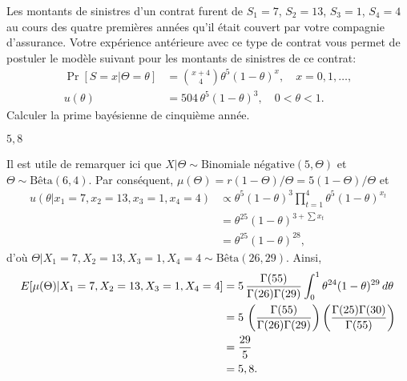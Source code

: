 \begin{exercice}
  Les montants de sinistres d'un contrat furent de $S_1 = 7$, $S_2 =
  13$, $S_3 = 1$, $S_4 = 4$ au cours des quatre premières années qu'il
  était couvert par votre compagnie d'assurance. Votre expérience
  antérieure avec ce type de contrat vous permet de postuler le modèle
  suivant pour les montants de sinistres de ce contrat:
  \begin{align*}
    \Pr[S = x|\Theta = \theta]
    &= \binom{x + 4}{4} \theta^5 (1 - \theta)^x, \quad x = 0, 1, \dots, \\
    u(\theta)
    &= 504\, \theta^5 (1 - \theta)^3, \quad 0 < \theta < 1.
  \end{align*}
  Calculer la prime bayésienne de cinquième année.
  \begin{rep}
    $5,8$
  \end{rep}
  \begin{sol}
    Il est utile de remarquer ici que $X|\Theta \sim \text{Binomiale
      négative}(5, \Theta)$ et $\Theta \sim \text{Bêta}(6, 4)$. Par
    conséquent, $\mu(\Theta) = r(1 - \Theta)/\Theta = 5(1 -
    \Theta)/\Theta$ et
    \begin{align*}
      u(\theta|x_1=7, x_2=13, x_3=1, x_4=4)
      &\propto \theta^5 (1 - \theta)^3
      \prod_{t=1}^4 \theta^5 (1 - \theta)^{x_t} \\
      &= \theta^{25} (1 - \theta)^{3+\sum x_t} \\
      &= \theta^{25} (1 - \theta)^{28},
    \end{align*}
    d'où $\Theta|X_1 = 7, X_2 = 13, X_3 = 1, X_4 = 4 \sim
    \text{Bêta}(26, 29)$. Ainsi,
    \begin{align*}
      E [ \mu(\Theta)|X_1=7, X_2=13, X_3=1, X_4=4 ]
      &= 5\, \frac{\Gamma(55)}{\Gamma(26) \Gamma(29)}
      \int_0^1 \theta^{24} (1 - \theta)^{29}\, d\theta \\
      &= 5\, \left(\frac{\Gamma(55)}{\Gamma(26) \Gamma(29)}\right)
      \left(\frac{\Gamma(25) \Gamma(30)}{\Gamma(55)}\right) \\
      &= \frac{29}{5} \\
      &= 5,8.
    \end{align*}
  \end{sol}
\end{exercice}

